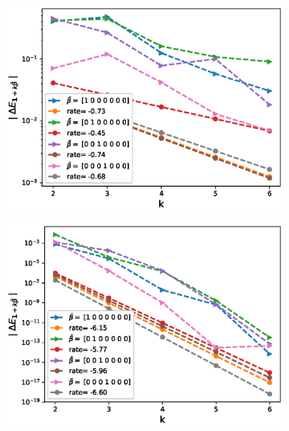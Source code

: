 \FloatBarrier
\begin{figure}[htb]
	\centering %
	\begin{subfigure}{0.4\textwidth}
		\includegraphics[width=\linewidth]{./figures/Heston_single_call_full_truncation_vol/mixed_rates/set4/N_4/first_difference_heston_4steps_hierarchical}
		\caption{}
		\label{fig:1}
	\end{subfigure}\hfil %
	\begin{subfigure}{0.4\textwidth}
		\includegraphics[width=\linewidth]{./figures/Heston_single_call_ABR_moment_matching/mixed_rates/set4/N_4/first_difference_heston_4steps_hierarchical}
		\caption{}
		\label{fig:2}
	\end{subfigure}\hfil %
	\begin{subfigure}{0.4\textwidth}

\end{subfigure}
\end{figure}
